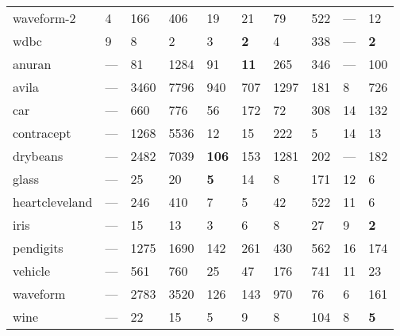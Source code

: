 \begin{table}[ht]
\begin{tabular}{llllllllll}
  waveform-2 & \scriptsize{4} & \scriptsize{166} & \scriptsize{406} & 19 & \scriptsize{21} & 79 & \scriptsize{522} & --- & 12 \\ 
  wdbc & \scriptsize{9} & 8 & \scriptsize{2} & \scriptsize{3} & \textbf{2} & \scriptsize{4} & \scriptsize{338} & --- & \textbf{2} \\ 
  anuran & --- & 81 & 1284 & 91 & \textbf{11} & 265 & 346 & --- & 100 \\ 
  avila & --- & 3460 & 7796 & 940 & 707 & \scriptsize{1297} & \scriptsize{181} & \scriptsize{8} & 726 \\ 
  car & --- & 660 & 776 & 56 & 172 & \scriptsize{72} & 308 & \scriptsize{14} & 132 \\ 
  contracept & --- & 1268 & \scriptsize{5536} & 12 & \scriptsize{15} & \scriptsize{222} & \scriptsize{5} & \scriptsize{14} & 13 \\ 
  drybeans & --- & 2482 & 7039 & \textbf{106} & 153 & \scriptsize{1281} & 202 & --- & 182 \\ 
  glass & --- & 25 & 20 & \textbf{5} & 14 & 8 & 171 & \scriptsize{12} & 6 \\ 
  heartcleveland & --- & \scriptsize{246} & \scriptsize{410} & 7 & \scriptsize{5} & 42 & \scriptsize{522} & \scriptsize{11} & 6 \\ 
  iris & --- & 15 & 13 & 3 & 6 & 8 & 27 & \scriptsize{9} & \textbf{2} \\ 
  pendigits & --- & 1275 & 1690 & 142 & 261 & 430 & 562 & \scriptsize{16} & 174 \\ 
  vehicle & --- & 561 & \scriptsize{760} & 25 & 47 & 176 & \scriptsize{741} & \scriptsize{11} & 23 \\ 
  waveform & --- & \scriptsize{2783} & \scriptsize{3520} & 126 & 143 & \scriptsize{970} & \scriptsize{76} & \scriptsize{6} & 161 \\ 
  wine & --- & 22 & 15 & 5 & 9 & 8 & 104 & \scriptsize{8} & \textbf{5} \\ 
   \hline
\end{tabular}
\end{table}